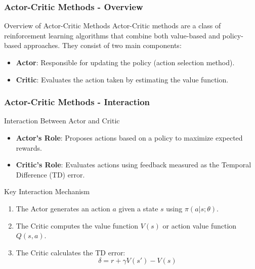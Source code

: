 \documentclass[aspectratio=169]{beamer}
\begin{document}
\begin{frame}[fragile]
    \frametitle{Actor-Critic Methods - Overview}
    \begin{block}{Overview of Actor-Critic Methods}
        Actor-Critic methods are a class of reinforcement learning algorithms that combine both value-based and policy-based approaches. They consist of two main components:
        \begin{itemize}
            \item \textbf{Actor}: Responsible for updating the policy (action selection method).
            \item \textbf{Critic}: Evaluates the action taken by estimating the value function.
        \end{itemize}
    \end{block}
\end{frame}

\begin{frame}[fragile]
    \frametitle{Actor-Critic Methods - Interaction}
    \begin{block}{Interaction Between Actor and Critic}
        \begin{itemize}
            \item \textbf{Actor's Role}: Proposes actions based on a policy to maximize expected rewards.
            \item \textbf{Critic's Role}: Evaluates actions using feedback measured as the Temporal Difference (TD) error.
        \end{itemize}
        \begin{block}{Key Interaction Mechanism}
            \begin{enumerate}
                \item The Actor generates an action \( a \) given a state \( s \) using \( \pi(a|s; \theta) \).
                \item The Critic computes the value function \( V(s) \) or action value function \( Q(s, a) \).
                \item The Critic calculates the TD error:
                \begin{equation}
                \delta = r + \gamma V(s') - V(s)
                \end{equation}
            \end{enumerate}
        \end{block}
    \end{block}
\end{frame}
\end{document}
